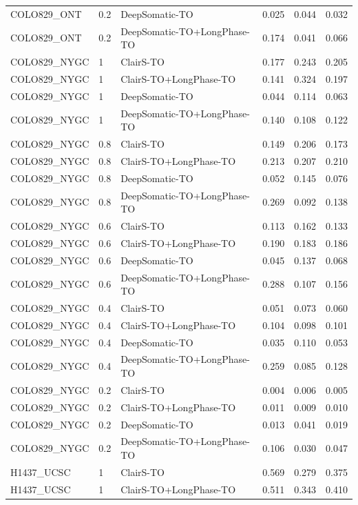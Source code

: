 \documentclass[pdflatex,sn-nature]{sn-jnl}
\begin{document}
{\begin{longtable}{@{}lllccc@{}}
  COLO829\_ONT & 0.2 & DeepSomatic-TO & 0.025 & 0.044 & 0.032 \\
  COLO829\_ONT & 0.2 & DeepSomatic-TO+LongPhase-TO & 0.174 & 0.041 & 0.066 \\
  COLO829\_NYGC & 1 & ClairS-TO & 0.177 & 0.243 & 0.205 \\
  COLO829\_NYGC & 1 & ClairS-TO+LongPhase-TO & 0.141 & 0.324 & 0.197 \\
  COLO829\_NYGC & 1 & DeepSomatic-TO & 0.044 & 0.114 & 0.063 \\
  COLO829\_NYGC & 1 & DeepSomatic-TO+LongPhase-TO & 0.140 & 0.108 & 0.122 \\
  COLO829\_NYGC & 0.8 & ClairS-TO & 0.149 & 0.206 & 0.173 \\
  COLO829\_NYGC & 0.8 & ClairS-TO+LongPhase-TO & 0.213 & 0.207 & 0.210 \\
  COLO829\_NYGC & 0.8 & DeepSomatic-TO & 0.052 & 0.145 & 0.076 \\
  COLO829\_NYGC & 0.8 & DeepSomatic-TO+LongPhase-TO & 0.269 & 0.092 & 0.138 \\
  COLO829\_NYGC & 0.6 & ClairS-TO & 0.113 & 0.162 & 0.133 \\
  COLO829\_NYGC & 0.6 & ClairS-TO+LongPhase-TO & 0.190 & 0.183 & 0.186 \\
  COLO829\_NYGC & 0.6 & DeepSomatic-TO & 0.045 & 0.137 & 0.068 \\
  COLO829\_NYGC & 0.6 & DeepSomatic-TO+LongPhase-TO & 0.288 & 0.107 & 0.156 \\
  COLO829\_NYGC & 0.4 & ClairS-TO & 0.051 & 0.073 & 0.060 \\
  COLO829\_NYGC & 0.4 & ClairS-TO+LongPhase-TO & 0.104 & 0.098 & 0.101 \\
  COLO829\_NYGC & 0.4 & DeepSomatic-TO & 0.035 & 0.110 & 0.053 \\
  COLO829\_NYGC & 0.4 & DeepSomatic-TO+LongPhase-TO & 0.259 & 0.085 & 0.128 \\
  COLO829\_NYGC & 0.2 & ClairS-TO & 0.004 & 0.006 & 0.005 \\
  COLO829\_NYGC & 0.2 & ClairS-TO+LongPhase-TO & 0.011 & 0.009 & 0.010 \\
  COLO829\_NYGC & 0.2 & DeepSomatic-TO & 0.013 & 0.041 & 0.019 \\
  COLO829\_NYGC & 0.2 & DeepSomatic-TO+LongPhase-TO & 0.106 & 0.030 & 0.047 \\
  H1437\_UCSC & 1 & ClairS-TO & 0.569 & 0.279 & 0.375 \\
  H1437\_UCSC & 1 & ClairS-TO+LongPhase-TO & 0.511 & 0.343 & 0.410 \\

\end{longtable}}
\end{document}
